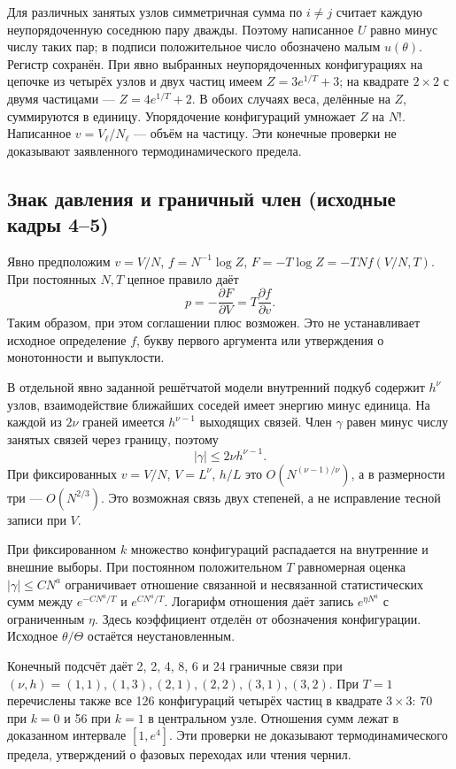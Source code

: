 \documentclass[11pt]{article}
\begin{document}
Для различных занятых узлов симметричная сумма по \(i\ne j\) считает каждую неупорядоченную соседнюю пару дважды. Поэтому написанное \(U\) равно минус числу таких пар; в подписи положительное число обозначено малым \(u(\theta)\). Регистр сохранён. При явно выбранных неупорядоченных конфигурациях на цепочке из четырёх узлов и двух частиц имеем \(Z=3e^{1/T}+3\); на квадрате \(2\times2\) с двумя частицами — \(Z=4e^{1/T}+2\). В обоих случаях веса, делённые на \(Z\), суммируются в единицу. Упорядочение конфигураций умножает \(Z\) на \(N!\). Написанное \(v=V_\ell/N_\ell\) — объём на частицу. Эти конечные проверки не доказывают заявленного термодинамического предела.

\subsection*{Знак давления и граничный член (исходные кадры 4–5)}
Явно предположим \(v=V/N\), \(f=N^{-1}\log Z\), \(F=-T\log Z=-TNf(V/N,T)\). При постоянных \(N,T\) цепное правило даёт
\[p=-\frac{\partial F}{\partial V}=T\frac{\partial f}{\partial v}.\]
Таким образом, при этом соглашении плюс возможен. Это не устанавливает исходное определение \(f\), букву первого аргумента или утверждения о монотонности и выпуклости.

В отдельной явно заданной решётчатой модели внутренний подкуб содержит \(h^\nu\) узлов, взаимодействие ближайших соседей имеет энергию минус единица. На каждой из \(2\nu\) граней имеется \(h^{\nu-1}\) выходящих связей. Член \(\gamma\) равен минус числу занятых связей через границу, поэтому
\[|\gamma|\le 2\nu h^{\nu-1}.\]
При фиксированных \(v=V/N\), \(V=L^\nu\), \(h/L\) это \(O(N^{(\nu-1)/\nu})\), а в размерности три — \(O(N^{2/3})\). Это возможная связь двух степеней, а не исправление тесной записи при \(V\).

При фиксированном \(k\) множество конфигураций распадается на внутренние и внешние выборы. При постоянном положительном \(T\) равномерная оценка \(|\gamma|\le CN^a\) ограничивает отношение связанной и несвязанной статистических сумм между \(e^{-CN^a/T}\) и \(e^{CN^a/T}\). Логарифм отношения даёт запись \(e^{\eta N^a}\) с ограниченным \(\eta\). Здесь коэффициент отделён от обозначения конфигурации. Исходное \(\theta/\Theta\) остаётся неустановленным.

Конечный подсчёт даёт 2, 2, 4, 8, 6 и 24 граничные связи при \((\nu,h)=(1,1),(1,3),(2,1),(2,2),(3,1),(3,2)\). При \(T=1\) перечислены также все 126 конфигураций четырёх частиц в квадрате \(3\times3\): 70 при \(k=0\) и 56 при \(k=1\) в центральном узле. Отношения сумм лежат в доказанном интервале \([1,e^4]\). Эти проверки не доказывают термодинамического предела, утверждений о фазовых переходах или чтения чернил.
\end{document}
